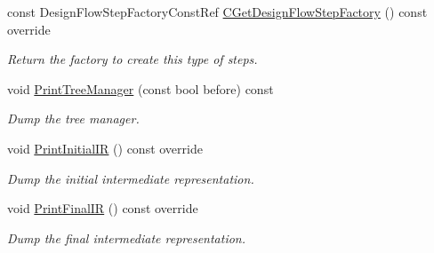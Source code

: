\begin{DoxyCompactItemize}
const Design\+Flow\+Step\+Factory\+Const\+Ref \hyperlink{classFrontendFlowStep_a6d36a52be3de210e018389f802f940a7}{C\+Get\+Design\+Flow\+Step\+Factory} () const override
\begin{DoxyCompactList}\small\item\em Return the factory to create this type of steps. \end{DoxyCompactList}\item 
void \hyperlink{classFrontendFlowStep_a2d170a44221abe07d4186a3a00bee56b}{Print\+Tree\+Manager} (const bool before) const
\begin{DoxyCompactList}\small\item\em Dump the tree manager. \end{DoxyCompactList}\item 
void \hyperlink{classFrontendFlowStep_aa4082589c5838cc22e2b4ea7097b5c16}{Print\+Initial\+IR} () const override
\begin{DoxyCompactList}\small\item\em Dump the initial intermediate representation. \end{DoxyCompactList}\item 
void \hyperlink{classFrontendFlowStep_a2a9b475fe6e3739803cb4e6afdc94a01}{Print\+Final\+IR} () const override
\begin{DoxyCompactList}\small\item\em Dump the final intermediate representation. \end{DoxyCompactList}\end{DoxyCompactItemize}
